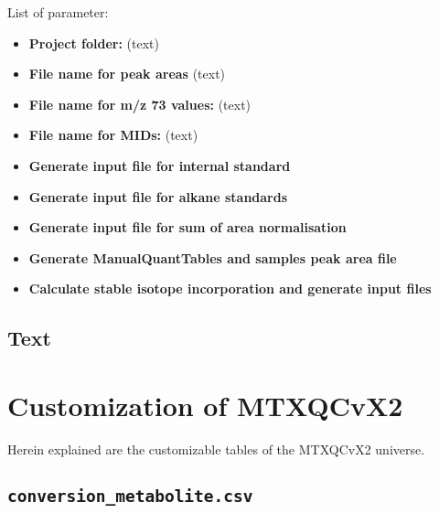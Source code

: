 \documentclass[]{book}
\providecommand{\tightlist}{%
  \setlength{\itemsep}{0pt}\setlength{\parskip}{0pt}}
\begin{document}
List of parameter:

\begin{itemize}
\tightlist
\item
  \textbf{Project folder:} (text)
\item
  \textbf{File name for peak areas} (text)
\item
  \textbf{File name for m/z 73 values:} (text)
\item
  \textbf{File name for MIDs:} (text)
\item
  \textbf{Generate input file for internal standard}
\item
  \textbf{Generate input file for alkane standards}
\item
  \textbf{Generate input file for sum of area normalisation}
\item
  \textbf{Generate ManualQuantTables and samples peak area file}
\item
  \textbf{Calculate stable isotope incorporation and generate input files}
\end{itemize}

\hypertarget{text-3}{%
\section{Text}\label{text-3}}

\hypertarget{config}{%
\chapter{Customization of MTXQCvX2}\label{config}}

Herein explained are the customizable tables of the MTXQCvX2 universe.

\hypertarget{conversion_metabolite.csv}{%
\section{\texorpdfstring{\texttt{conversion\_metabolite.csv}}{conversion\_metabolite.csv}}\label{conversion_metabolite.csv}}
\end{document}
